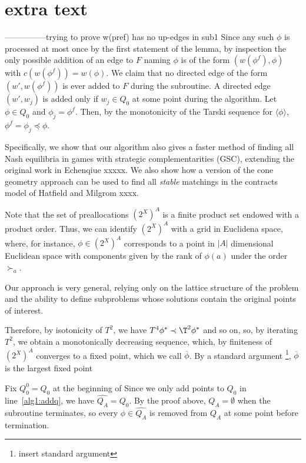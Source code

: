 \documentclass[11pt,reqno]{amsart}
\theoremstyle{definition}
\numberwithin{equation}{section}
\newcommand{\wh}{\widehat}
\newcommand{\ol}{\overline}
\newcommand{\lag}{\langle}
\newcommand{\rag}{\rangle}
\newcommand{\pre}{\phi}
\newcommand{\prealloc}{(2^X)^A}
\newcommand{\peq}{\preceq}
\newcommand{\su}{\succ}
\newcommand{\pe}{\prec}
\newcommand{\toppre}{\ol{\pre}}
\newcommand{\acto}{Q_0}
\newcommand{\acta}{Q_A}
\newcommand{\actacum}{\wh{Q_A}}
\newcommand{\actocum}{\wh{Q_0}}
\newcommand{\forest}{F}
\begin{document}
\section{extra text} 

---------------trying to prove w(pref) has no up-edges in sub1 
Since any such $\pre$ is processed at most once by the first statement of the lemma, by inspection the only possible addition of an edge to $\forest$ naming $\pre$ is of the form $(w(\pre^f),\pre)$ with $c(w(\pre^f)) = w(\pre)$.  
We claim that no directed edge of the form $(w', w(\pre^f))$ is ever added to $\forest$ during the subroutine. 
A directed edge $(w',w_j)$ is added only if $w_j \in \acto$ at some point during the algorithm. 
Let $\pre \in \acto$ and $\pre_j = \pre^f$. 
Then, by the monotonicity of the Tarski sequence for $\lag \pre \rag$, $\pre^f = \pre_j \peq \pre$.

Specifically, we show that our algorithm also gives a faster method of finding all Nash equilibria in games with strategic complementarities (GSC), extending the original work in Echenqiue xxxxx.  
We also show how a version of the cone geometry approach can be used to find all \emph{stable} matchings in the contracts model of Hatfield and Milgrom xxxx.  

Note that the set of preallocations $\prealloc$ is a finite product set endowed with a product order.
Thus, we can identify $\prealloc$ with a grid in Euclidena space, where, for instance, $\pre \in \prealloc$ corresponds to a point in $|A|$ dimensional Euclidean space with components given by the rank of $\pre(a)$ under the order $\su_a$. 

Our approach is very general, relying only on the lattice structure of the problem and the ability to define subproblems whose solutions contain the original points of interest.  

Therefore, by isotonicity of $T^2$, we have $T^4 \pre^* \pe \T^2 \pre^*$ and so on, so, by iterating $T^2$, we obtain a monotonically decreasing sequence, which, by finiteness of $\prealloc$ converges to a fixed point, which we call $\toppre$.
By a standard argument \footnote{insert standard argument}, $\toppre$ is the largest fixed point 

Fix $\acto^{0} = \acto$ at the beginning of 
Since we only add points to $\acto$ in line~\ref{alg1:addq}, we have $\actacum = \actocum$. 
By the proof above, $\acta = \emptyset$ when the subroutine terminates, so every $\pre \in \actacum$ is removed from $\acta$ at some point before termination.
\end{document}
